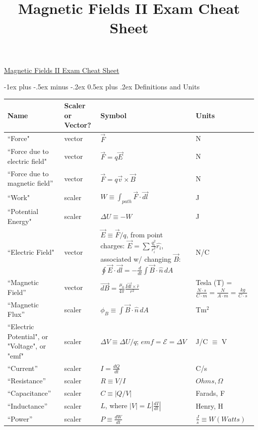 \documentclass[10pt,landscape]{article}
\title{Magnetic Fields II Exam Cheat Sheet}
\makeatletter
\renewcommand{\section}{\@startsection{section}{1}{0mm}%
                                {-1ex plus -.5ex minus -.2ex}%
                                {0.5ex plus .2ex}%
                                {\normalfont\large\bfseries}}
\makeatother
\begin{document}
\raggedright
\footnotesize
\begin{multicols}{3}


\setlength{\premulticols}{1pt}
\setlength{\postmulticols}{1pt}
\setlength{\multicolsep}{1pt}
\setlength{\columnsep}{2pt}

\begin{center}
     \Large{\underline{Magnetic Fields II Exam Cheat Sheet}} \\
\end{center}

\section{Definitions and Units}
    \begin{tabular}{| L{1.7cm} | L{1.5cm} | L{2cm} | R{1cm} |}
    \hline
    Name & Scaler or Vector? & Symbol & Units \\ \hline
    ``Force" & vector & $\vec{F}$ & N \\ 
    ``Force due to electric field" & vector & $\vec{F} = q\vec{E}$ & N\\
    ``Force due to magnetic field'' & vector & $\vec{F} = q\vec{v}\times\vec{B}$ & N \\
    \hline
    ``Work" & scaler & $W \equiv \int_{path}\vec{F}\cdot\vec{dl}$ & J \\ \hline
    ``Potential Energy" & scaler & $\Delta U\equiv -W$ & J \\ \hline
    ``Electric Field" & vector & $\vec{E}\equiv\vec{F}/q$, from point charges: $\vec{E} = \sum\frac{q_i^2}{r_i^2}\hat{r_i}$, associated w/ changing $\vec{B}$: $\oint\vec{E}\cdot\vec{dl} = -\frac{d}{dt}\int\vec{B}\cdot\hat{n}\,dA$ & N/C \\ \hline
    ``Magnetic Field'' & vector & $\vec{dB} = \frac{\mu_0}{4\pi}\frac{I\vec{dl}\times\hat{r}}{r^2}$ & Tesla (T) = $\frac{N\cdot s}{C\cdot m}=\frac{N}{A\cdot m}= \frac{kg}{C\cdot s}$ \\\hline
    
    ``Magnetic Flux'' & scaler & $\phi_B \equiv\int\vec{B}\cdot \hat{n} \,dA$ & Tm$^2$ \\ \hline
    ``Electric Potential", or "Voltage", or "emf" & scaler & $\Delta V\equiv\Delta U/q$; $emf=\mathcal{E}=\Delta V$ & J/C $\equiv$ V\\
    \hline
    ``Current'' & scaler & $I = \frac{dQ}{dt}$ & C/s \\\hline
    ``Resistance'' & scaler & $R\equiv V/I$ & $Ohms, \Omega$ \\ \hline
    ``Capacitance'' & scaler & $C \equiv |Q/V|$ & Farads, F \\\hline
    ``Inductance'' & scaler & $L$, where $|V| = L|\frac{dI}{dt}|$ & Henry, H \\\hline
    ``Power'' & scaler & $P \equiv \frac{dW}{dt}$ & $\frac{J}{s} \equiv W (Watts)$ \\ \hline
    \end{tabular}


\end{multicols}
\end{document}
